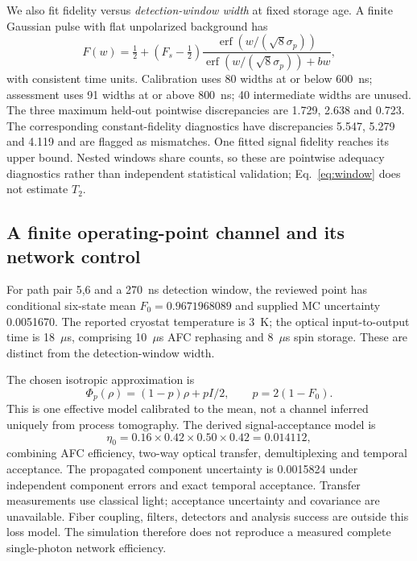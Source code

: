 \documentclass[11pt,a4paper]{article}
\begin{document}
We also fit fidelity versus \emph{detection-window width} at fixed storage age. A finite Gaussian pulse with flat unpolarized background has
\begin{equation}
F(w)=\tfrac12+(F_s-\tfrac12)
\frac{\operatorname{erf}(w/(\sqrt8\sigma_p))}
{\operatorname{erf}(w/(\sqrt8\sigma_p))+bw},
\label{eq:window}
\end{equation}
with consistent time units. Calibration uses 80 widths at or below 600~ns; assessment uses 91 widths at or above 800~ns; 40 intermediate widths are unused. The three maximum held-out pointwise discrepancies are 1.729, 2.638 and 0.723. The corresponding constant-fidelity diagnostics have discrepancies 5.547, 5.279 and 4.119 and are flagged as mismatches. One fitted signal fidelity reaches its upper bound. Nested windows share counts, so these are pointwise adequacy diagnostics rather than independent statistical validation; Eq.~\eqref{eq:window} does not estimate $T_2$.

\subsection{A finite operating-point channel and its network control}
For path pair 5,6 and a 270~ns detection window, the reviewed point has conditional six-state mean $F_0=0.9671968089$ and supplied MC uncertainty 0.0051670. The reported cryostat temperature is 3~K; the optical input-to-output time is 18~$\mu$s, comprising 10~$\mu$s AFC rephasing and 8~$\mu$s spin storage. These are distinct from the detection-window width.

The chosen isotropic approximation is
\begin{equation}
\Phi_p(\rho)=(1-p)\rho+pI/2,\qquad p=2(1-F_0).
\label{eq:point}
\end{equation}
This is one effective model calibrated to the mean, not a channel inferred uniquely from process tomography. The derived signal-acceptance model is
\begin{equation}
\eta_0=0.16\times0.42\times0.50\times0.42=0.014112,
\end{equation}
combining AFC efficiency, two-way optical transfer, demultiplexing and temporal acceptance. The propagated component uncertainty is 0.0015824 under independent component errors and exact temporal acceptance. Transfer measurements use classical light; acceptance uncertainty and covariance are unavailable. Fiber coupling, filters, detectors and analysis success are outside this loss model. The simulation therefore does not reproduce a measured complete single-photon network efficiency.
\end{document}
